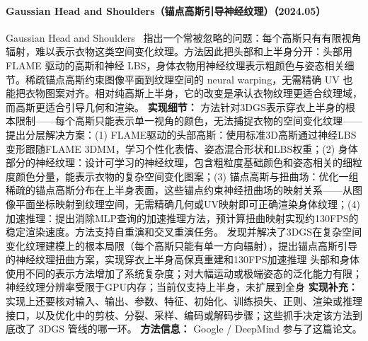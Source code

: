 \paragraph{Gaussian Head and Shoulders（锚点高斯引导神经纹理）（2024.05）}
Gaussian Head and Shoulders~\cite{2405_12069} 指出一个常被忽略的问题：每个高斯只有有限视角辐射，难以表示衣物这类空间变化纹理。方法因此把头部和上半身分开：头部用 FLAME 驱动的高斯和神经 LBS，身体衣物用神经纹理表示粗颜色与姿态相关细节。稀疏锚点高斯约束图像平面到纹理空间的 neural warping，无需精确 UV 也能把衣物图案对齐。相对纯高斯上半身，它的改变是承认衣物纹理更适合纹理域，而高斯更适合引导几何和渲染。
\textbf{实现细节：} 方法针对3DGS表示穿衣上半身的根本限制——每个高斯只能表示单一视角的颜色，无法捕捉衣物的空间变化纹理——提出分层解决方案：(1) FLAME驱动的头部高斯：使用标准3D高斯通过神经LBS变形跟随FLAME 3DMM，学习个性化表情、姿态混合形状和LBS权重；(2) 身体部分的神经纹理：设计可学习的神经纹理，包含粗粒度基础颜色和姿态相关的细粒度颜色分量，能表示衣物的复杂空间变化图案；(3) 锚点高斯与扭曲场：优化一组稀疏的锚点高斯分布在上半身表面，这些锚点约束神经扭曲场的映射关系——从图像平面坐标映射到纹理空间，无需精确几何或UV映射即可正确渲染身体纹理；(4) 加速推理：提出消除MLP查询的加速推理方法，预计算扭曲映射实现约130FPS的稳定渲染速度。方法支持自重演和交叉重演任务。 发现并解决了3DGS在复杂空间变化纹理建模上的根本局限（每个高斯只能有单一方向辐射），提出锚点高斯引导的神经纹理扭曲方案，实现穿衣上半身高保真重建和130FPS加速推理 头部和身体使用不同的表示方法增加了系统复杂度；对大幅运动或极端姿态的泛化能力有限；神经纹理分辨率受限于GPU内存；当前仅支持上半身，未扩展到全身
\textbf{实现补充：} 实现上还要核对输入、输出、参数、特征、初始化、训练损失、正则、渲染或推理接口，以及优化中的剪枝、分裂、采样、编码或解码步骤；这些抓手决定该方法到底改了 3DGS 管线的哪一环。
\textbf{方法信息：} Google / DeepMind 参与了这篇论文。



